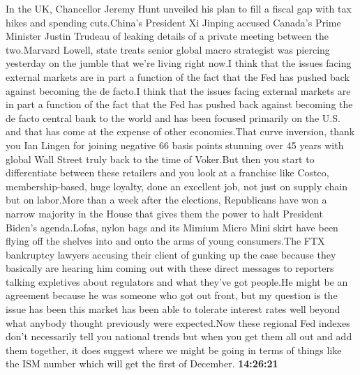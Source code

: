 \documentclass{article}%
\begin{document}
In the UK, Chancellor Jeremy Hunt unveiled his plan to fill a fiscal gap with tax hikes and spending cuts.China's President Xi Jinping accused Canada's Prime Minister Justin Trudeau of leaking details of a private meeting between the two.Marvard Lowell, state treats senior global macro strategist was piercing yesterday on the jumble that we're living right now.I think that the issues facing external markets are in part a function of the fact that the Fed has pushed back against becoming the de facto.I think that the issues facing external markets are in part a function of the fact that the Fed has pushed back against becoming the de facto central bank to the world and has been focused primarily on the U.S. and that has come at the expense of other economies.That curve inversion, thank you Ian Lingen for joining negative 66 basis points stunning over 45 years with global Wall Street truly back to the time of Voker.But then you start to differentiate between these retailers and you look at a franchise like Costco, membership{-}based, huge loyalty, done an excellent job, not just on supply chain but on labor.More than a week after the elections, Republicans have won a narrow majority in the House that gives them the power to halt President Biden's agenda.Lofas, nylon bags and its Mimium Micro Mini skirt have been flying off the shelves into and onto the arms of young consumers.The FTX bankruptcy lawyers accusing their client of gunking up the case because they basically are hearing him coming out with these direct messages to reporters talking expletives about regulators and what they've got people.He might be an agreement because he was someone who got out front, but my question is the issue has been this market has been able to tolerate interest rates well beyond what anybody thought previously were expected.Now these regional Fed indexes don't necessarily tell you national trends but when you get them all out and add them together, it does suggest where we might be going in terms of things like the ISM number which will get the first of December.%
\textbf{14:26:21}%
\newline%
\end{document}
